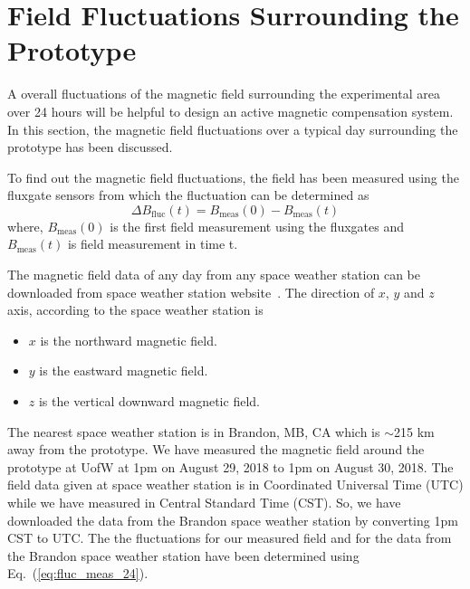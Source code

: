 








\section{Field Fluctuations Surrounding the Prototype}\label{sec:field}
 
A overall fluctuations of the magnetic field surrounding the experimental area over 24 hours will be helpful to design an active magnetic compensation system. In this section, the magnetic field fluctuations over a typical day surrounding the prototype has been discussed. 

To find out the magnetic field fluctuations, the field has been measured using the fluxgate sensors from which the fluctuation can be determined as
\begin{equation}\label{eq:fluc_meas_24}
    \Delta B_{\mathrm{fluc}}(t) = B_{\mathrm{meas}}(0) - B_{\mathrm{meas}}(t)
\end{equation}
where, $B_{\mathrm{meas}}(0)$ is the first field measurement using the fluxgates and $B_{\mathrm{meas}}(t)$ is field measurement in time t.

The magnetic field data of any day from any space weather station can be downloaded from space weather station website~\cite{weather_station}. The direction of $x$, $y$ and $z$ axis, according to the space weather station is
\begin{itemize}
    \item $x$ is the northward magnetic field.
    \item $y$ is the eastward magnetic field.
    \item $z$ is the vertical downward magnetic field.
\end{itemize}
The nearest space weather station is in Brandon, MB, CA which is $\sim$215 km away from the prototype. We have measured the magnetic field around the prototype at UofW at 1pm on August 29, 2018 to 1pm on August 30, 2018. The field data given at space weather station is in Coordinated Universal Time (UTC) while we have measured in Central Standard Time (CST). So, we have downloaded the data from the Brandon space weather station by converting 1pm CST to UTC. The the fluctuations for our measured field and for the data from the Brandon space weather station have been determined using Eq.~(\ref{eq:fluc_meas_24}).

